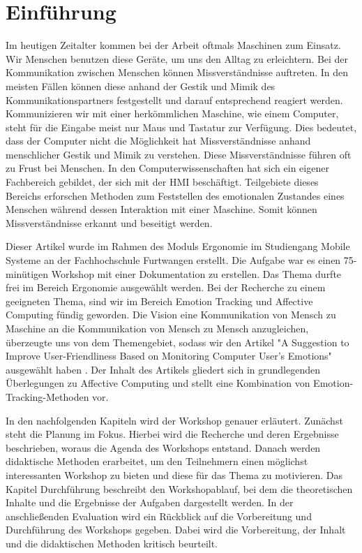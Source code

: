 \section{Einführung}

Im heutigen Zeitalter kommen bei der Arbeit oftmals Maschinen zum Einsatz. Wir Menschen benutzen diese Geräte, um uns den Alltag zu erleichtern. Bei der Kommunikation zwischen Menschen können Missverständnisse auftreten. In den meisten Fällen können diese anhand der Gestik und Mimik des Kommunikationspartners festgestellt und darauf entsprechend reagiert werden. Kommunizieren wir mit einer herkömmlichen Maschine, wie einem Computer, steht für die Eingabe meist nur Maus und Tastatur zur Verfügung. Dies bedeutet, dass der Computer nicht die Möglichkeit hat Missverständnisse anhand menschlicher Gestik und Mimik zu verstehen. Diese Missverständnisse führen oft zu Frust bei Menschen. In den Computerwissenschaften hat sich ein eigener Fachbereich gebildet, der sich mit der \ac{HMI} beschäftigt. Teilgebiete dieses Bereichs erforschen Methoden zum Feststellen des emotionalen Zustandes eines Menschen während dessen Interaktion mit einer Maschine. Somit können Missverständnisse erkannt und beseitigt werden.

Dieser Artikel wurde im Rahmen des Moduls Ergonomie im Studiengang Mobile Systeme an der Fachhochschule Furtwangen erstellt. Die Aufgabe war es einen 75-minütigen Workshop mit einer Dokumentation zu erstellen. Das Thema durfte frei im Bereich Ergonomie ausgewählt werden. Bei der Recherche zu einem geeigneten Thema, sind wir im Bereich Emotion Tracking und Affective Computing fündig geworden. Die Vision eine Kommunikation von Mensch zu Maschine an die Kommunikation von Mensch zu Mensch anzugleichen, überzeugte uns von dem Themengebiet, sodass wir den Artikel "A Suggestion to Improve User-Friendliness Based on Monitoring Computer User’s Emotions" ausgewählt haben \cite{EmotionTrackingGSR}. Der Inhalt des Artikels gliedert sich in grundlegenden Überlegungen zu Affective Computing und stellt eine Kombination von Emotion-Tracking-Methoden vor.

In den nachfolgenden Kapiteln wird der Workshop genauer erläutert. Zunächst steht die Planung im Fokus. Hierbei wird die Recherche und deren Ergebnisse beschrieben, woraus die Agenda des Workshops entstand. Danach werden didaktische Methoden erarbeitet, um den Teilnehmern einen möglichst interessanten Workshop zu bieten und diese für das Thema zu motivieren. Das Kapitel Durchführung beschreibt den Workshopablauf, bei dem die theoretischen Inhalte und die Ergebnisse der Aufgaben dargestellt werden. In der anschließenden Evaluation wird ein Rückblick auf die Vorbereitung und Durchführung des Workshops gegeben. Dabei wird die Vorbereitung, der Inhalt und die didaktischen Methoden kritisch beurteilt.
